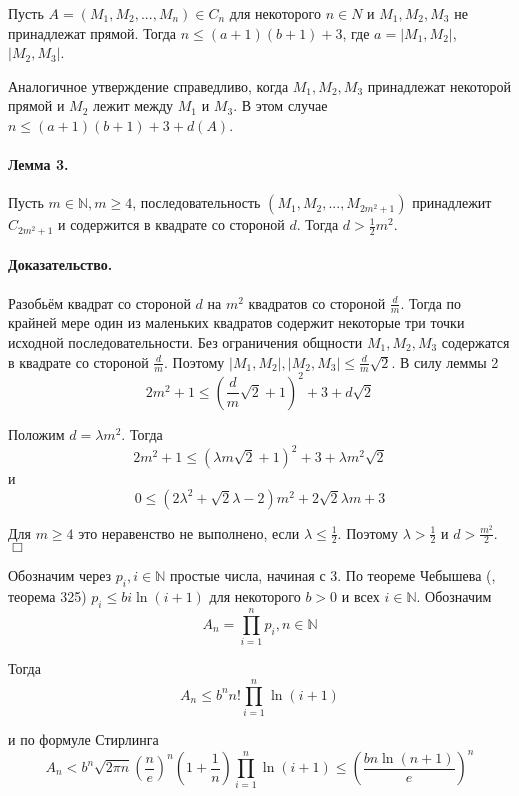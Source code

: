 \documentclass[a4paper,14pt]{article} %
\begin{document}
Пусть $A=(M_1, M_2, ..., M_n) \in C_n$ для некоторого $n\in N$ и $M_1, M_2, M_3$ не принадлежат прямой.
Тогда $n\leq (a+1)(b+1)+3$, где $a=|M_1,M_2|$, $|M_2,M_3|$.

Аналогичное утверждение справедливо, когда $M_1,M_2,M_3$ принадлежат некоторой прямой и $M_2$ лежит между $M_1$ и $M_3$.
В этом случае
$n\leq (a+1)(b+1)+3+d(A)$.



\paragraph{Лемма 3.}
Пусть $m\in\mathbb{N}, m\geq 4$, последовательность $(M_1,M_2,...,M_{2m^2+1})$ принадлежит $C_{2m^2+1}$ и содержится в квадрате со стороной $d$.
Тогда $d>\frac{1}{2}m^2$.

\paragraph{Доказательство.} Разобьём квадрат со стороной $d$ на $m^2$ квадратов со стороной $\frac{d}{m}$.
Тогда по крайней мере один из маленьких квадратов содержит некоторые три точки исходной последовательности.
Без ограничения общности $M_1,M_2,M_3$ содержатся в квадрате со стороной $\frac{d}{m}$.
Поэтому $|M_1,M_2|,|M_2,M_3| \leq \frac{d}{m}\sqrt{2}$.
В силу леммы 2
$$
2m^2+1 \leq\left(\frac{d}{m}\sqrt{2}+1\right)^2+3+d\sqrt{2}
$$

Положим $d=\lambda m^2$.
Тогда
$$
2m^2+1 \leq \left(\lambda m \sqrt2 + 1 \right)^2 + 3 + \lambda m^2 \sqrt2
$$
и
$$
0\leq \left( 2\lambda^2 + \sqrt2 \lambda - 2 \right)m^2 + 2\sqrt2 \lambda m + 3
$$

Для $m\geq 4$ это неравенство не выполнено, если $\lambda \leq \frac{1}{2}$.
Поэтому $\lambda > \frac{1}{2}$ и $d>\frac{m^2}{2}$.
$\Box$


Обозначим через $p_i, i\in\mathbb{N}$ простые числа, начиная с 3.
По теореме Чебышева (\cite{Buhshtab}, теорема 325) $p_i \leq bi\ln(i+1)$ для некоторого $b>0$ и всех $i\in\mathbb{N}$.
Обозначим
$$
A_n=\prod_{i=1}^{n} p_i, n\in\mathbb{N}
$$

Тогда
$$
A_n\leq b^n n! \prod_{i=1}^{n} \ln(i+1)
$$

и по формуле Стирлинга
\begin{equation}\label{ocenka_Stirling}
A_n <
b^n \sqrt{2\pi n} \left(\frac{n}{e}\right)^n \left(1+\frac{1}{n}\right) \prod_{i=1}^{n} \ln(i+1)
\leq \left(\frac{bn\ln (n+1)}{e}\right)^n
\end{equation}
\end{document}
